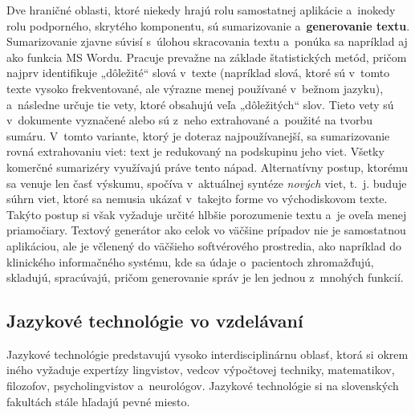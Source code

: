 \begin{multicols}{2}
Dve hraničné oblasti, ktoré niekedy hrajú rolu samostatnej aplikácie a~inokedy rolu podporného, skrytého komponentu, sú sumarizovanie a~\textbf{generovanie textu}. Sumarizovanie zjavne súvisí s~úlohou skracovania textu a~ponúka sa napríklad aj ako funkcia MS Wordu. Pracuje prevažne na základe štatistických metód, pričom najprv identifikuje „dôležité“ slová v~texte (napríklad slová, ktoré sú v~tomto texte vysoko frekventované, ale výrazne menej používané v~bežnom jazyku), a~následne určuje tie vety, ktoré obsahujú veľa „dôležitých“ slov. Tieto vety sú v~dokumente vyznačené alebo sú z~neho extrahované a~použité na tvorbu sumáru. V~tomto variante, ktorý je doteraz najpoužívanejší, sa sumarizovanie rovná extrahovaniu viet: text je redukovaný na podskupinu jeho viet. Všetky komerčné sumarizéry využívajú práve tento nápad. Alternatívny postup, ktorému sa venuje len časť výskumu, spočíva v~aktuálnej syntéze \emph{nových} viet, t.~j. buduje súhrn viet, ktoré sa nemusia ukázať v~takejto forme vo východiskovom texte. Takýto postup si však vyžaduje určité hlbšie porozumenie textu a~je oveľa menej priamočiary. Textový generátor ako celok vo väčšine prípadov nie je samostatnou aplikáciou, ale je včlenený do väčšieho softvérového prostredia, ako napríklad do klinického informačného systému, kde sa údaje o~pacientoch zhromažďujú, skladujú, spracúvajú, pričom generovanie správ je len jednou z~mnohých funkcií. 

\subsection{Jazykové technológie vo vzdelávaní}
Jazykové technológie predstavujú vysoko interdisciplinárnu oblasť, ktorá si okrem iného vyžaduje expertízy lingvistov, vedcov výpočtovej techniky, matematikov, filozofov, psycholingvistov a~neurológov. Jazykové technológie si na slovenských fakultách stále hľadajú pevné miesto.



\end{multicols}
